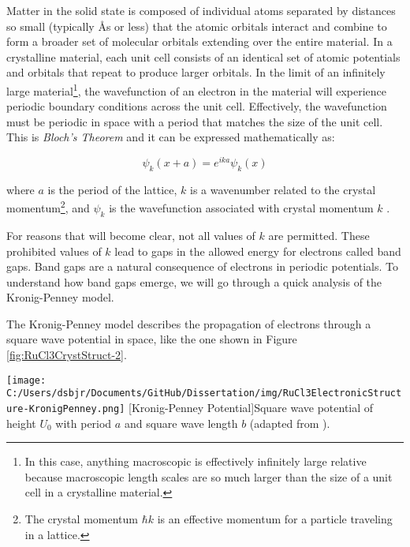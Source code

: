 Matter in the solid state is composed of individual atoms separated by distances so small (typically \AA s or less) that the atomic orbitals interact and combine to form a broader set of molecular orbitals extending over the entire material. In a crystalline material, each unit cell consists of an identical set of atomic potentials and orbitals that repeat to produce larger orbitals. In the limit of an infinitely large material\footnote{In this case, anything macroscopic is effectively infinitely large relative because macroscopic length scales are so much larger than the size of a unit cell in a crystalline material.}, the wavefunction of an electron in the material will experience periodic boundary conditions across the unit cell. Effectively, the wavefunction must be periodic in space with a period that matches the size of the unit cell. This is \textit{Bloch's Theorem} and it can be expressed mathematically as:

\begin{equation}
\psi_{k}(x + a) = e^{ika} \psi_{k}(x)
\end{equation}

where $a$ is the period of the lattice, $k$ is a wavenumber related to the crystal momentum\footnote{The crystal momentum $\hbar k$ is an effective momentum for a particle traveling in a lattice.}, and $\psi_{k}$ is the wavefunction associated with crystal momentum $k$ \cite{Davies1997}.

For reasons that will become clear, not all values of $k$ are permitted. These prohibited values of $k$ lead to gaps in the allowed energy for electrons called band gaps. Band gaps are a natural consequence of electrons in periodic potentials. To understand how band gaps emerge, we will go through a quick analysis of the Kronig-Penney model.

The Kronig-Penney model describes the propagation of electrons through a square wave potential in space, like the one shown in Figure \ref{fig:RuCl3CrystStruct-2}.

\begin{centering}
\texttt{[image: C:/Users/dsbjr/Documents/GitHub/Dissertation/img/RuCl3ElectronicStructure-KronigPenney.png]}
  \captionsetup{width=0.75\textwidth}
  [Kronig-Penney Potential]{Square wave potential of height $U_{0}$ with period $a$ and square wave length $b$ (adapted from \cite{Erez2014}).} 
  \label{fig:RuCl3CrystStruct-2}
\end{centering}

